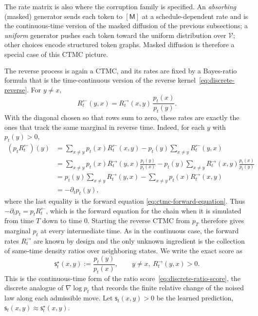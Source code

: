 \documentclass{amsart}
\numberwithin{equation}{section}
\theoremstyle{plain}
\theoremstyle{definition}
\theoremstyle{remark}
\newcommand{\mc}[1]{\mathcal{#1}}
\newcommand{\sstar}{\mathsf{s}^{\star}}
\newcommand{\score}{\mathsf{s}}
\begin{document}
The rate matrix is also where the corruption family is specified.  An
\emph{absorbing} (masked) generator sends each token to $[\mathsf M]$ at a
schedule-dependent rate and is the continuous-time version of the masked
diffusion of the previous subsections; a \emph{uniform} generator pushes each
token toward the uniform distribution over $\mc{V}$; other choices encode
structured token graphs.  Masked diffusion is therefore a special case of this CTMC picture.

The reverse process is again a CTMC, and its rates are fixed by a Bayes-ratio
formula that is the time-continuous version of the reverse
kernel~\eqref{eq:discrete-reverse}.  For $y\neq x$,
\begin{equation}\label{eq:ctmc-reverse-rate}
    R_t^{\leftarrow}(y,x)
    =
    R_t^{\to}(x,y)\,\frac{p_t(x)}{p_t(y)}.
\end{equation}
With the diagonal chosen so that rows sum to zero, these rates are exactly the
ones that track the same marginal in reverse time.  Indeed, for each
$y$ with $p_t(y)>0$,
\[
\begin{aligned}
    (p_tR_t^{\leftarrow})(y)
    &=
    \sum_{x\neq y}p_t(x)R_t^{\leftarrow}(x,y)
    -
    p_t(y)\sum_{x\neq y}R_t^{\leftarrow}(y,x)  \\
    &=
    \sum_{x\neq y}p_t(x)R_t^{\to}(y,x)\frac{p_t(y)}{p_t(x)}
    -
    p_t(y)\sum_{x\neq y}R_t^{\to}(x,y)\frac{p_t(x)}{p_t(y)}  \\
    &=
    p_t(y)\sum_{x\neq y}R_t^{\to}(y,x)
    -
    \sum_{x\neq y}p_t(x)R_t^{\to}(x,y)  \\
    &=
    -\partial_t p_t(y),
\end{aligned}
\]
where the last equality is the forward equation
\eqref{eq:ctmc-forward-equation}.  Thus
$-\partial_t p_t=p_tR_t^{\leftarrow}$, which is the forward equation for the
chain when it is simulated from time $T$ down to time $0$.  Starting the reverse
CTMC from $p_T$ therefore gives marginal $p_t$ at every intermediate time.
As in the continuous case, the forward rates $R_t^{\to}$ are known by design and
the only unknown ingredient is the collection of same-time density ratios over
neighboring states.  We write the exact score as
\[
    \sstar_t(x,y):=\frac{p_t(y)}{p_t(x)},
    \qquad y\neq x,\ R_t^{\to}(y,x)>0.
\]
This is the continuous-time form of the ratio
score~\eqref{eq:discrete-ratio-score}, the discrete analogue of
$\nabla\log p_t$ that records the finite relative change of the noised law along
each admissible move.  Let $\score_t(x,y)>0$ be the learned prediction,
$\score_t(x,y)\approx\sstar_t(x,y)$.
\end{document}
